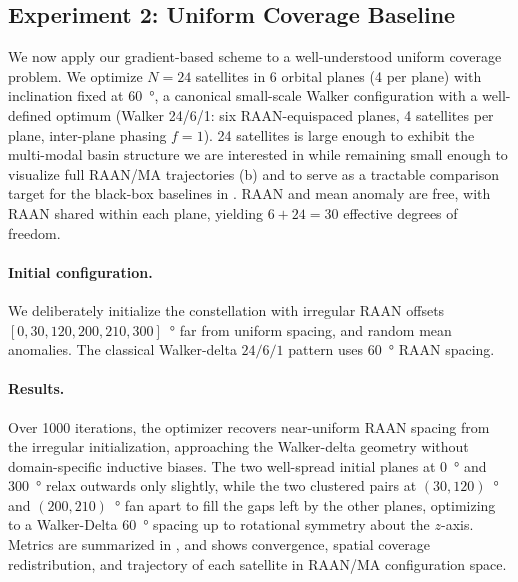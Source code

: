 \subsection{Experiment 2: Uniform Coverage Baseline}
\label{sec:uniform}

We now apply our gradient-based scheme to a well-understood uniform coverage problem. We optimize $N = 24$ satellites in 6 orbital planes (4 per plane) with inclination fixed at \SI{60}{\degree}, a canonical small-scale Walker configuration with a well-defined optimum (Walker 24/6/1: six RAAN-equispaced planes, 4 satellites per plane, inter-plane phasing $f=1$). 24 satellites is large enough to exhibit the multi-modal basin structure we are interested in while remaining small enough to visualize full RAAN/MA trajectories (b) and to serve as a tractable comparison target for the black-box baselines in .
RAAN and mean anomaly are free, with RAAN shared within each plane, yielding $6 + 24 = 30$ effective degrees of freedom.

\paragraph{Initial configuration.}
We deliberately initialize the constellation with irregular RAAN offsets $[0, 30, 120, 200, 210, 300]$\SI{}{\degree} far from uniform spacing, and random mean anomalies. The classical Walker-delta $24/6/1$ pattern uses \SI{60}{\degree} RAAN spacing.

\paragraph{Results.}
Over 1000 iterations, the optimizer recovers near-uniform RAAN spacing from the irregular initialization, approaching the Walker-delta geometry without domain-specific inductive biases.
The two well-spread initial planes at \SI{0}{\degree} and \SI{300}{\degree} relax outwards only slightly, while the two clustered pairs at $(30, 120)$\SI{}{\degree} and $(200, 210)$\SI{}{\degree} fan apart to fill the gaps left by the other planes, optimizing to a Walker-Delta \SI{60}{\degree} spacing up to rotational symmetry about the $z$-axis. Metrics are summarized in 
, and  shows convergence, spatial coverage redistribution, and trajectory of each satellite in RAAN/MA configuration space.


